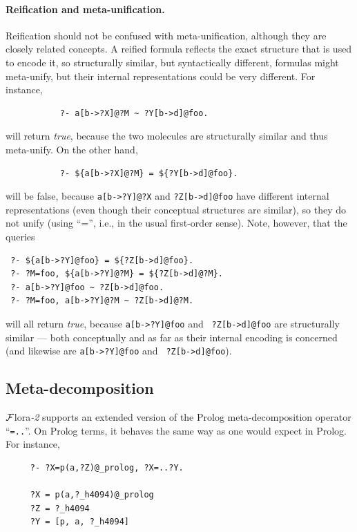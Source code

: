\documentclass[11pt]{article}
\newcommand{\FLORA}{{\mbox{\sc ${\cal F}${lora}\rm\emph{-2}}}\xspace}
\begin{document}
\paragraph{Reification and meta-unification.}
Reification should not be confused with meta-unification, although they are
closely related concepts. A reified formula reflects the exact structure that is used
to encode it, so structurally similar, but syntactically different, formulas
might meta-unify, but their internal representations could be very different.
For instance, 
\begin{verbatim}
           ?- a[b->?X]@?M ~ ?Y[b->d]@foo.
\end{verbatim}
will return \emph{true}, because the two molecules are structurally similar
and thus meta-unify. On the other hand,
\begin{verbatim}
           ?- ${a[b->?X]@?M} = ${?Y[b->d]@foo}.
\end{verbatim}
will be false, because {\tt a[b->?Y]@?X} and {\tt ?Z[b->d]@foo} have different
internal representations (even though their conceptual structures are
similar), so they do not unify (using ``='', i.e., in the usual
first-order sense). Note, however, that the queries
\begin{verbatim}
 ?- ${a[b->?Y]@foo} = ${?Z[b->d]@foo}.
 ?- ?M=foo, ${a[b->?Y]@?M} = ${?Z[b->d]@?M}.
 ?- a[b->?Y]@foo ~ ?Z[b->d]@foo.
 ?- ?M=foo, a[b->?Y]@?M ~ ?Z[b->d]@?M.
\end{verbatim}
will all return \emph{true}, because {\tt a[b->?Y]@foo} and {\tt
  ?Z[b->d]@foo} are structurally similar --- both conceptually and as far as
  their
internal encoding is concerned (and likewise are {\tt a[b->?Y]@foo} and {\tt
  ?Z[b->d]@foo}).

\subsection{Meta-decomposition}\label{sec-meta-decomp}

\FLORA supports an extended version of the Prolog meta-decomposition
operator ``{\tt =..}''. On Prolog terms, it behaves the same way as one
would expect in Prolog. For instance, 
\begin{verbatim}
     ?- ?X=p(a,?Z)@_prolog, ?X=..?Y.
 
     ?X = p(a,?_h4094)@_prolog
     ?Z = ?_h4094
     ?Y = [p, a, ?_h4094]
\end{verbatim}
\end{document}
